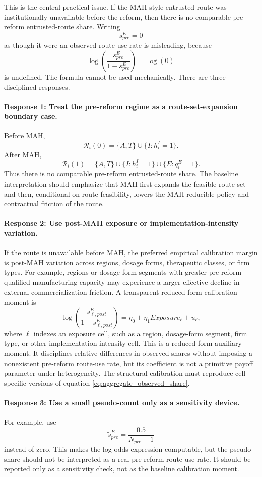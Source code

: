 \documentclass[12pt]{article}
\newcommand{\1}{\mathbf{1}}
\newcommand{\calR}{\mathcal{R}}
\begin{document}
This is the central practical issue. If the MAH-style entrusted route was institutionally unavailable before the reform, then there is no comparable pre-reform entrusted-route share. Writing
\[
    s_{pre}^E=0
\]
as though it were an observed route-use rate is misleading, because
\[
    \log\left(\frac{s_{pre}^E}{1-s_{pre}^E}\right)=\log(0)
\]
is undefined. The formula cannot be used mechanically. There are three disciplined responses.

\paragraph{Response 1: Treat the pre-reform regime as a route-set-expansion boundary case.}
Before MAH,
\[
    \calR_i(0)=\{A,T\}\cup\{I:h_i^I=1\}.
\]
After MAH,
\[
    \calR_i(1)=\{A,T\}\cup\{I:h_i^I=1\}\cup\{E:q_i^E=1\}.
\]
Thus there is no comparable pre-reform entrusted-route share. The baseline interpretation should emphasize that MAH first expands the feasible route set and then, conditional on route feasibility, lowers the MAH-reducible policy and contractual friction of the route.

\paragraph{Response 2: Use post-MAH exposure or implementation-intensity variation.}
If the route is unavailable before MAH, the preferred empirical calibration margin is post-MAH variation across regions, dosage forms, therapeutic classes, or firm types. For example, regions or dosage-form segments with greater pre-reform qualified manufacturing capacity may experience a larger effective decline in external commercialization friction. A transparent reduced-form calibration moment is
\[
    \log\left(\frac{s_{\ell,post}^E}{1-s_{\ell,post}^E}\right)
    =
    \eta_0+\eta_1 Exposure_\ell+u_\ell,
\]
where $\ell$ indexes an exposure cell, such as a region, dosage-form segment, firm type, or other implementation-intensity cell. This is a reduced-form auxiliary moment. It disciplines relative differences in observed shares without imposing a nonexistent pre-reform route-use rate, but its coefficient is not a primitive payoff parameter under heterogeneity. The structural calibration must reproduce cell-specific versions of equation \eqref{eq:aggregate_observed_share}.

\paragraph{Response 3: Use a small pseudo-count only as a sensitivity device.}
For example, use
\[
    \tilde{s}_{pre}^E
    =
    \frac{0.5}{N_{pre}+1}
\]
instead of zero. This makes the log-odds expression computable, but the pseudo-share should not be interpreted as a real pre-reform route-use rate. It should be reported only as a sensitivity check, not as the baseline calibration moment.
\end{document}

